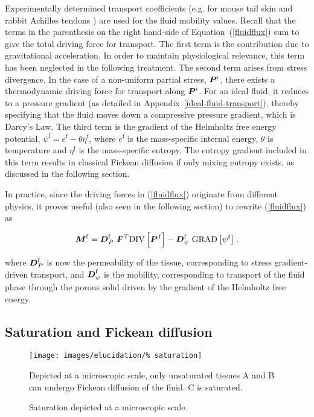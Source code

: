 Experimentally determined transport coefficients (e.g. for mouse tail
skin \citep{Swartzetal:99} and rabbit Achilles tendons
\citep{Hanetal:2000}) are used for the fluid mobility values. Recall
that the terms in the parenthesis on the right hand-side of
\mbox{Equation (\ref{fluidflux})} sum to give the total driving force
for transport. The first term is the contribution due to gravitational
acceleration. In order to maintain physiological relevance, this term
has been neglected in the following treatment. The second term arises
from stress divergence. In the case of a non-uniform partial stress,
$\mbox{\boldmath$ P$}^\iota$, there exists a thermodynamic driving force for transport
along $\mbox{\boldmath$ P$}^\iota$. For an ideal fluid, it reduces to a pressure
gradient (as detailed in Appendix~\ref{ideal-fluid-transport}),
thereby specifying that the fluid moves down a compressive pressure
gradient, which is Darcy's Law. The third term is the gradient of the
Helmholtz free energy potential, $\psi^\mathrm{f} = e^\mathrm{f} -
\theta \eta^\mathrm{f}$, where $e^\mathrm{f}$ is the mass-specific
internal energy, $\theta$ is temperature and $\eta^\mathrm{f}$ is the
mass-specific entropy. The entropy gradient included in this term
results in classical Fickean diffusion if only mixing entropy exists,
as discussed in the following section.

In practice, since the driving forces in (\ref{fluidflux}) originate
from different physics, it proves useful (also seen in the following
section) to rewrite (\ref{fluidflux}) as

\begin{equation}
\bM^\mathrm{f} = \bD^\mathrm{f}_{P}\ \bF^T\mathrm{DIV}
\left[\bP^{\,\mathrm{f}}\right] -
\bD^\mathrm{f}_{\psi}\ \mathrm{GRAD}\left[\psi^\mathrm{f}\right],
\label{splitflux}
\end{equation}

\noindent where $\mbox{\boldmath$ D$}^\mathrm{f}_{P}$ is now the permeability of the
tissue, corresponding to stress gradient-driven transport, and
$\mbox{\boldmath$ D$}^\mathrm{f}_{\psi}$ is the mobility, corresponding to transport of
the fluid phase through the porous solid driven by the gradient of the
Helmholtz free energy.

\subsection{Saturation and Fickean diffusion}
\label{saturation-and-fickean-diffusion}

\begin{figure}
  \begin{center}
    \texttt{[image: images/elucidation/\%
      saturation]}
    \caption{Saturation depicted at a microscopic scale.}
    \label{fickean-diffusion}
  \end{center}
      {Depicted at a microscopic scale, only unsaturated tissues A and
        B can undergo Fickean diffusion of the fluid. C is saturated.}
\end{figure}

